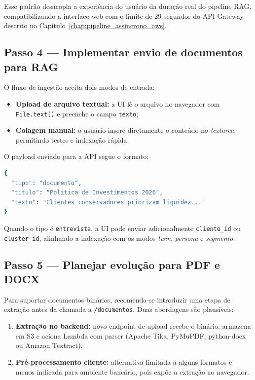 Esse padr\~ao desacopla a experi\^encia do usu\'ario da dura\c{c}\~ao real do
pipeline RAG, compatibilizando a interface web com o limite de 29 segundos
do API Gateway descrito no Cap\'itulo~\ref{chap:pipeline_assincrono_aws}.

\subsection{Passo 4 --- Implementar envio de documentos para RAG}

O fluxo de ingest\~ao aceita dois modos de entrada:

\begin{itemize}[leftmargin=*]
  \item \textbf{Upload de arquivo textual:} a UI l\^e o arquivo no navegador
        com \texttt{File.text()} e preenche o campo \texttt{texto};
  \item \textbf{Colagem manual:} o usu\'ario insere diretamente o conte\'udo
        no \textit{textarea}, permitindo testes e indexa\c{c}\~ao r\'apida.
\end{itemize}

O payload enviado para a API segue o formato:

\begin{lstlisting}[language=bash,
  caption={Payload de ingest\~ao de documento no RAG.},
  label={lst:payload_documento_rag}]
{
  "tipo": "documento",
  "titulo": "Politica de Investimentos 2026",
  "texto": "Clientes conservadores priorizam liquidez..."
}
\end{lstlisting}

Quando o tipo \'e \texttt{entrevista}, a UI pode enviar adicionalmente
\texttt{cliente\_id} ou \texttt{cluster\_id}, alinhando a indexa\c{c}\~ao com
os modos \textit{twin}, \textit{persona} e \textit{segmento}.

\subsection{Passo 5 --- Planejar evolu\c{c}\~ao para PDF e DOCX}

Para suportar documentos bin\'arios, recomenda-se introduzir uma etapa de
extra\c{c}\~ao antes da chamada a \texttt{/documentos}. Duas abordagens s\~ao
plaus\'iveis:

\begin{enumerate}[leftmargin=*]
  \item \textbf{Extra\c{c}\~ao no backend:} novo endpoint de upload recebe o
        bin\'ario, armazena em S3 e aciona Lambda com parser (Apache Tika,
        PyMuPDF, python-docx ou Amazon Textract).
  \item \textbf{Pr\'e-processamento cliente:} alternativa limitada a alguns
        formatos e menos indicada para ambiente banc\'ario, pois exp\~oe a
        extra\c{c}\~ao ao navegador.
\end{enumerate}

